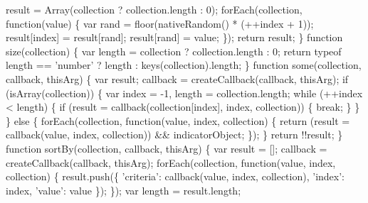 \begin{DoxyCodeInclude}
{{\textcolor{stringliteral}{        result = Array(collection ? collection.length : 0);}
\textcolor{stringliteral}{}
\textcolor{stringliteral}{    forEach(collection, function(value) \{}
\textcolor{stringliteral}{      var rand = floor(nativeRandom() * (++index + 1));}
\textcolor{stringliteral}{      result[index] = result[rand];}
\textcolor{stringliteral}{      result[rand] = value;}
\textcolor{stringliteral}{    \});}
\textcolor{stringliteral}{    return result;}
\textcolor{stringliteral}{  \}}
\textcolor{stringliteral}{}
\textcolor{stringliteral}{  function size(collection) \{}
\textcolor{stringliteral}{    var length = collection ? collection.length : 0;}
\textcolor{stringliteral}{    return typeof length == 'number' ? length : keys(collection).length;}
\textcolor{stringliteral}{  \}}
\textcolor{stringliteral}{}
\textcolor{stringliteral}{  function some(collection, callback, thisArg) \{}
\textcolor{stringliteral}{    var result;}
\textcolor{stringliteral}{    callback = createCallback(callback, thisArg);}
\textcolor{stringliteral}{}
\textcolor{stringliteral}{    if (isArray(collection)) \{}
\textcolor{stringliteral}{      var index = -1,}
\textcolor{stringliteral}{          length = collection.length;}
\textcolor{stringliteral}{}
\textcolor{stringliteral}{      while (++index < length) \{}
\textcolor{stringliteral}{        if (result = callback(collection[index], index, collection)) \{}
\textcolor{stringliteral}{          break;}
\textcolor{stringliteral}{        \}}
\textcolor{stringliteral}{      \}}
\textcolor{stringliteral}{    \} else \{}
\textcolor{stringliteral}{      forEach(collection, function(value, index, collection) \{}
\textcolor{stringliteral}{        return (result = callback(value, index, collection)) && indicatorObject;}
\textcolor{stringliteral}{      \});}
\textcolor{stringliteral}{    \}}
\textcolor{stringliteral}{    return !!result;}
\textcolor{stringliteral}{  \}}
\textcolor{stringliteral}{}
\textcolor{stringliteral}{  function sortBy(collection, callback, thisArg) \{}
\textcolor{stringliteral}{    var result = [];}
\textcolor{stringliteral}{    callback = createCallback(callback, thisArg);}
\textcolor{stringliteral}{    forEach(collection, function(value, index, collection) \{}
\textcolor{stringliteral}{      result.push(\{}
\textcolor{stringliteral}{        'criteria': callback(value, index, collection),}
\textcolor{stringliteral}{        'index': index,}
\textcolor{stringliteral}{        'value': value}
\textcolor{stringliteral}{      \});}
\textcolor{stringliteral}{    \});}
\textcolor{stringliteral}{}
\textcolor{stringliteral}{    var length = result.length;}
}}
\end{DoxyCodeInclude}
